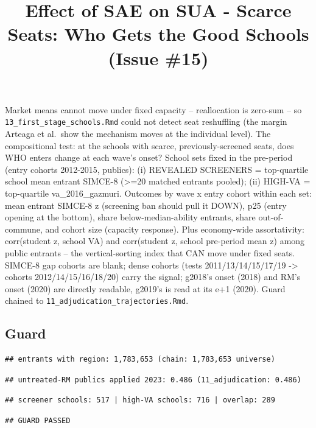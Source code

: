 \documentclass[
]{article}
\title{Effect of SAE on SUA - Scarce Seats: Who Gets the Good Schools
(Issue \#15)}
\author{}
\date{\vspace{-2.5em}}
\begin{document}
\maketitle

Market means cannot move under fixed capacity -- reallocation is
zero-sum -- so \texttt{13\_first\_stage\_schools.Rmd} could not detect
seat reshuffling (the margin Arteaga et al.~show the mechanism moves at
the individual level). The compositional test: at the schools with
scarce, previously-screened seats, does WHO enters change at each wave's
onset? School sets fixed in the pre-period (entry cohorts 2012-2015,
publics): (i) REVEALED SCREENERS = top-quartile school mean entrant
SIMCE-8 (\textgreater=20 matched entrants pooled); (ii) HIGH-VA =
top-quartile va\_2016\_gazmuri. Outcomes by wave x entry cohort within
each set: mean entrant SIMCE-8 z (screening ban should pull it DOWN),
p25 (entry opening at the bottom), share below-median-ability entrants,
share out-of-commune, and cohort size (capacity response). Plus
economy-wide assortativity: corr(student z, school VA) and corr(student
z, school pre-period mean z) among public entrants -- the
vertical-sorting index that CAN move under fixed seats. SIMCE-8 gap
cohorts are blank; dense cohorts (tests 2011/13/14/15/17/19
-\textgreater{} cohorts 2012/14/15/16/18/20) carry the signal; g2018's
onset (2018) and RM's onset (2020) are directly readable, g2019's is
read at its e+1 (2020). Guard chained to
\texttt{11\_adjudication\_trajectories.Rmd}.

\hypertarget{guard}{%
\subsection{Guard}\label{guard}}

\begin{verbatim}
## entrants with region: 1,783,653 (chain: 1,783,653 universe)
\end{verbatim}

\begin{verbatim}
## untreated-RM publics applied 2023: 0.486 (11_adjudication: 0.486)
\end{verbatim}

\begin{verbatim}
## screener schools: 517 | high-VA schools: 716 | overlap: 289
\end{verbatim}

\begin{verbatim}
## GUARD PASSED
\end{verbatim}
\end{document}
